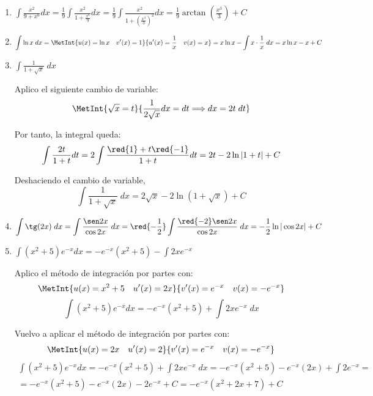 \begin{ejercicio}
\begin{enumerate}
    \item $\displaystyle \int \frac{x^2}{9+x^6}dx = \frac{1}{9}\int \frac{x^2}{1+\frac{x^6}{9}}dx = \frac{1}{9} \int \frac{x^2}{1+\left(\frac{x^3}{3}\right)^2} dx
    = \frac{1}{9} \arctan \left(\frac{x^3}{3}\right) +C$

    \item $\displaystyle \int \ln x\; dx = \MetInt{u(x)=\ln x \quad v'(x)=1}{u'(x)=\frac{1}{x} \quad v(x)=x} = x\ln x -\int x\cdot \frac{1}{x}\;dx = x\ln x -x + C$ 

    \item $\displaystyle \int \frac{1}{1+\sqrt{x}}\;dx$

    Aplico el siguiente cambio de variable:
    \begin{equation*}
        \MetInt{\sqrt{x}=t}{\frac{1}{2\sqrt{x}}dx = dt \Longrightarrow dx=2t\;dt}
    \end{equation*}

    Por tanto, la integral queda:
    \begin{equation*}
        \int\frac{2t}{1+t}dt = 2\int \frac{\red{1}+t\red{-1}}{1+t}dt = 2t-2\ln |1+t|+C
    \end{equation*}

    Deshaciendo el cambio de variable,
    \begin{equation*}
        \int \frac{1}{1+\sqrt{x}}\;dx = 2\sqrt{x}-2\ln (1+\sqrt{x})+C
    \end{equation*}


    \item $\displaystyle \int \tg(2x)\;dx = \int \frac{\sen 2x}{\cos 2x}\;dx = \red{-\frac{1}{2}} \int \frac{\red{-2}\sen 2x}{\cos 2x}\;dx = -\frac{1}{2}\ln |\cos 2x|+C$

    \item $\displaystyle \int (x^2+5)e^{-x}dx = -e^{-x}(x^2+5)-\int 2xe^{-x}$

    Aplico el método de integración por partes con:
    \begin{equation*}
         \MetInt{u(x)=x^2+5 \quad u'(x)=2x}{v'(x)=e^{-x}\quad v(x)=-e^{-x}}
    \end{equation*}
    \begin{equation*}
        \int (x^2+5)e^{-x}dx = -e^{-x}(x^2+5)+\int 2xe^{-x}\;dx
    \end{equation*}

    Vuelvo a aplicar el método de integración por partes con:
    \begin{equation*}
         \MetInt{u(x)=2x \quad u'(x)=2}{v'(x)=e^{-x}\quad v(x)=-e^{-x}}
    \end{equation*}
    \begin{multline*}
        \int (x^2+5)e^{-x}dx = -e^{-x}(x^2+5)+\int 2xe^{-x}\;dx
        = -e^{-x}(x^2+5) -e^{-x}(2x)+\int 2e^{-x}
        =\\=
        -e^{-x}(x^2+5) -e^{-x}(2x) -2e^{-x} +C
        = -e^{-x}(x^2+2x+7) +C
    \end{multline*}



\end{enumerate}
\end{ejercicio}

